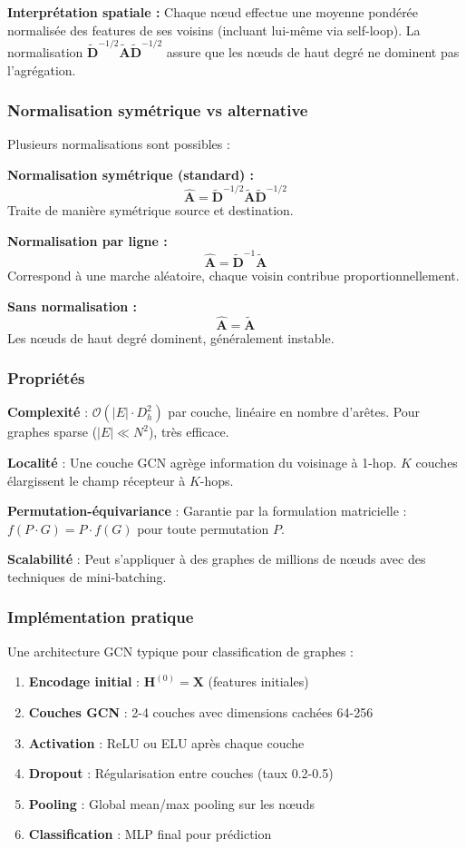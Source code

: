 \textbf{Interprétation spatiale :}
Chaque nœud effectue une moyenne pondérée normalisée des features de ses voisins (incluant lui-même via self-loop). La normalisation $\tilde{\mathbf{D}}^{-1/2}\tilde{\mathbf{A}}\tilde{\mathbf{D}}^{-1/2}$ assure que les nœuds de haut degré ne dominent pas l'agrégation.

\subsubsection{Normalisation symétrique vs alternative}

Plusieurs normalisations sont possibles :

\textbf{Normalisation symétrique (standard) :}
\[
\hat{\mathbf{A}} = \tilde{\mathbf{D}}^{-1/2}\tilde{\mathbf{A}}\tilde{\mathbf{D}}^{-1/2}
\]
Traite de manière symétrique source et destination.

\textbf{Normalisation par ligne :}
\[
\hat{\mathbf{A}} = \tilde{\mathbf{D}}^{-1}\tilde{\mathbf{A}}
\]
Correspond à une marche aléatoire, chaque voisin contribue proportionnellement.

\textbf{Sans normalisation :}
\[
\hat{\mathbf{A}} = \tilde{\mathbf{A}}
\]
Les nœuds de haut degré dominent, généralement instable.

\subsubsection{Propriétés}

\textbf{Complexité} : $\mathcal{O}(|E| \cdot D_h^2)$ par couche, linéaire en nombre d'arêtes. Pour graphes sparse ($|E| \ll N^2$), très efficace.

\textbf{Localité} : Une couche GCN agrège information du voisinage à 1-hop. $K$ couches élargissent le champ récepteur à $K$-hops.

\textbf{Permutation-équivariance} : Garantie par la formulation matricielle : $f(P \cdot G) = P \cdot f(G)$ pour toute permutation $P$.

\textbf{Scalabilité} : Peut s'appliquer à des graphes de millions de nœuds avec des techniques de mini-batching.

\subsubsection{Implémentation pratique}

Une architecture GCN typique pour classification de graphes :
\begin{enumerate}
    \item \textbf{Encodage initial} : $\mathbf{H}^{(0)} = \mathbf{X}$ (features initiales)
    \item \textbf{Couches GCN} : 2-4 couches avec dimensions cachées 64-256
    \item \textbf{Activation} : ReLU ou ELU après chaque couche
    \item \textbf{Dropout} : Régularisation entre couches (taux 0.2-0.5)
    \item \textbf{Pooling} : Global mean/max pooling sur les nœuds
    \item \textbf{Classification} : MLP final pour prédiction
\end{enumerate}

